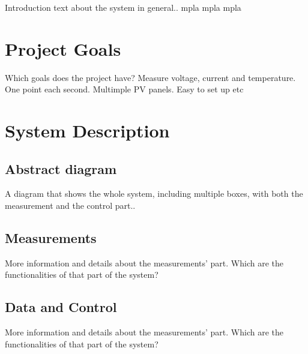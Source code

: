 Introduction text about the system in general..
mpla mpla mpla

\section{Project Goals}
Which goals does the project have? Measure voltage, current and temperature. One point each second. Multimple PV panels. Easy to set up etc

\section{System Description}
\subsection{Abstract diagram}
A diagram that shows the whole system, including multiple boxes, with both the measurement and the control part..

\subsection{Measurements}
More information and details about the measurements' part.
Which are the functionalities of that part of the system?

\subsection{Data and Control}
More information and details about the measurements' part.
Which are the functionalities of that part of the system?